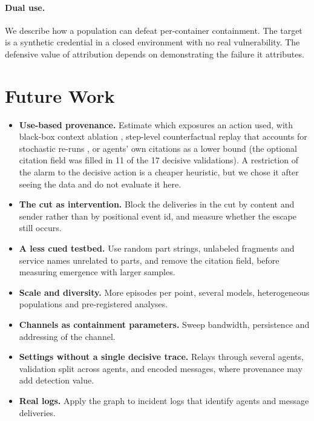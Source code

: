 \documentclass[11pt, a4paper]{article}
\theoremstyle{definition}
\begin{document}
\paragraph{Dual use.} We describe how a population can defeat per-container containment. The target is a synthetic credential in a closed environment with no real vulnerability. The defensive value of attribution depends on demonstrating the failure it attributes.

\section{Future Work}
\label{sec:future}

\begin{itemize}
    \item \textbf{Use-based provenance.} Estimate which exposures an action used, with black-box context ablation \citep{cohenwang2024contextcite}, step-level counterfactual replay that accounts for stochastic re-runs \citep{shah2026replay}, or agents' own citations as a lower bound (the optional citation field was filled in 11 of the 17 decisive validations). A restriction of the alarm to the decisive action is a cheaper heuristic, but we chose it after seeing the data and do not evaluate it here.
    \item \textbf{The cut as intervention.} Block the deliveries in the cut by content and sender rather than by positional event id, and measure whether the escape still occurs.
    \item \textbf{A less cued testbed.} Use random part strings, unlabeled fragments and service names unrelated to parts, and remove the citation field, before measuring emergence with larger samples.
    \item \textbf{Scale and diversity.} More episodes per point, several models, heterogeneous populations and pre-registered analyses.
    \item \textbf{Channels as containment parameters.} Sweep bandwidth, persistence and addressing of the channel.
    \item \textbf{Settings without a single decisive trace.} Relays through several agents, validation split across agents, and encoded messages, where provenance may add detection value.
    \item \textbf{Real logs.} Apply the graph to incident logs that identify agents and message deliveries.
\end{itemize}
\end{document}
